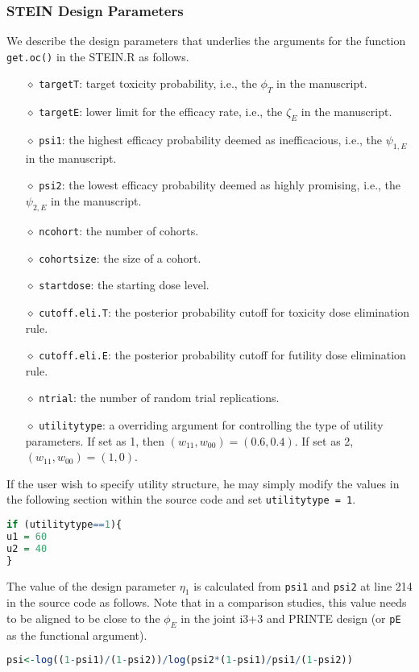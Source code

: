 \documentclass[notitlepage]{article}
\begin{document}
 \subsubsection{STEIN Design Parameters}
 We describe the design parameters that underlies the arguments for the function \texttt{get.oc()} in the  STEIN.R as follows.
 \begin{itemize}
\item[$\diamond$] \texttt{targetT}: target toxicity probability, i.e., the $\phi_T$ in the manuscript.
\item[$\diamond$] \texttt{targetE}: lower limit for the efficacy rate, i.e., the $\zeta_E$ in the manuscript.
\item[$\diamond$] \texttt{psi1}: the highest efficacy probability deemed as inefficacious, i.e., the $\psi_{1,E}$ in the manuscript.
\item[$\diamond$] \texttt{psi2}: the lowest efficacy probability deemed as highly promising, i.e., the $\psi_{2,E}$ in the manuscript.
\item[$\diamond$] \texttt{ncohort}: the number of cohorts.
\item[$\diamond$] \texttt{cohortsize}: the size of a cohort.
\item[$\diamond$] \texttt{startdose}: the starting dose level.
\item[$\diamond$] \texttt{cutoff.eli.T}: the posterior probability cutoff for toxicity dose elimination rule.
\item[$\diamond$] \texttt{cutoff.eli.E}: the posterior probability cutoff for futility dose elimination rule.
\item[$\diamond$] \texttt{ntrial}: the number of random trial replications.
\item[$\diamond$] \texttt{utilitytype}: a overriding argument for controlling the type of utility parameters. If set as 1, then $(w_{11},w_{00}) = (0.6,0.4)$. If set as 2, $(w_{11},w_{00}) = (1,0)$.
\end{itemize}


If the user wish to specify utility structure, he may simply modify the values in the following section within the source code and set \texttt{utilitytype = 1}.
\begin{lstlisting}[language=R]
if (utilitytype==1){
u1 = 60
u2 = 40
}
\end{lstlisting}

The value of the design parameter $\eta_1$ is calculated from \texttt{psi1} and \texttt{psi2} at line 214 in the source code as follows. Note that in a comparison studies, this value needs to be aligned to be close to the $\phi_E$ in the joint i3+3 and PRINTE design (or \texttt{pE} as the functional argument).
\begin{lstlisting}[language=R]
psi<-log((1-psi1)/(1-psi2))/log(psi2*(1-psi1)/psi1/(1-psi2))
\end{lstlisting}
\end{document}
